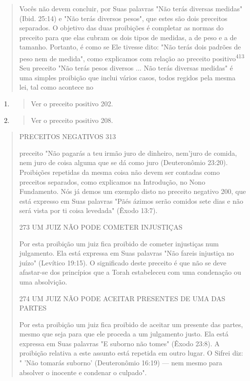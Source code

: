 \begin{quote}
Vocês não devem concluir, por Suas palavras "Não terás diversas
me­didas" (Ibid. 25:14) e "Não terás diversos pesos", que estes são dois
preceitos separados. O objetivo das duas proibições é completar as
normas do preceito para que elas cubram os dois tipos de medidas, a de
peso e a de tamanho. Por­tanto, é como se Ele tivesse dito: "Não terás
dois padrões de peso nem de me­dida", como explicamos com relação ao
preceito positivo\textsuperscript{413} Seu preceito "Não terás pesos
diversos ... Não terás diversas medidas" é uma simples proibi­ção que
inclui vários casos, todos regidos pela mesma lei, tal como acontece no
\end{quote}

\begin{enumerate}
\def\labelenumi{\arabic{enumi}.}
\setcounter{enumi}{411}
\item
  \begin{quote}
  Ver o preceito positivo 202.
  \end{quote}
\item
  \begin{quote}
  Ver o preceito positivo 208.
  \end{quote}
\end{enumerate}

\begin{quote}
PRECEITOS NEGATIVOS 313

preceito "Não pagarás a teu irmão juro de dinheiro, nem'juro de comida,
nem juro de coisa alguma que se dá como juro (Deuteronômio 23:20).
Proibições repetidas da mesma coisa não devem ser contadas como
preceitos separados, como explicamos na Introdução, no Nono Fundamento.
Nós já demos um exem­plo disto no preceito negativo 200, que está
expresso em Suas palavras "Pãés ázimos serão comidos sete dias e não
será vista por ti coisa levedada" (Êxodo 13:7).

273 UM JUIZ NÃO PODE COMETER INJUSTIÇAS

Por esta proibição um juiz fica proibido de cometer injustiças num
julgamento. Ela está expressa em Suas palavras "Não fareis injustiça no
juízo" (Levítico 19:15). O significado deste preceito é que não se deve
afastar-se dos princípios que a Torah estabeleceu com uma condenação ou
uma absolvição.

274 UM JUIZ NÃO PODE ACEITAR PRESENTES DE UMA DAS PARTES

Por esta proibição um juiz fica proibido de aceitar um presente das
partes, mesmo que seja para que ele proceda a um julgamento justo. Ela
está expressa em Suas palavras "E suborno não tomes" (Êxodo 23:8). A
proibição relativa a este assunto está repetida em outro lugar. O Sifrei
diz: " 'Não tomarás suborno' (Deuteronômio 16:19) --- nem mesmo para
absolver o inocente e con­denar o culpado".
\end{quote}

